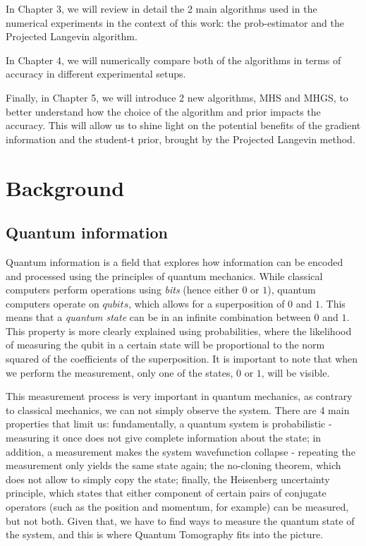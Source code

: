 \documentclass[12pt]{memoir}
\begin{document}
In Chapter 3, we will review in detail the 2 main algorithms used in the numerical experiments in the context of this work: the prob-estimator and the Projected Langevin algorithm.\medbreak

In Chapter 4, we will numerically compare both of the algorithms in terms of accuracy in different experimental setups.\medbreak

Finally, in Chapter 5, we will introduce 2 new algorithms, MHS and MHGS, to better understand how the choice of the algorithm and prior impacts the accuracy. This will allow us to shine light on the potential benefits of the gradient information and the student-t prior, brought by the Projected Langevin method.


\chapter{Background}

\section{Quantum information}

Quantum information is a field that explores how information can be encoded and processed using the principles of quantum mechanics. While classical computers perform operations using \textit{bits} (hence either $0$ or $1$), quantum computers operate on $qubits$, which allows for a superposition of $0$ and $1$. This means that a \textit{quantum state} can be in an infinite combination between $0$ and $1$. This property is more clearly explained using probabilities, where the likelihood of measuring the qubit in a certain state will be proportional to the norm squared of the coefficients of the superposition. It is important to note that when we perform the measurement, only one of the states, $0$ or $1$, will be visible.\medbreak

This measurement process is very important in quantum mechanics, as contrary to classical mechanics, we can not simply observe the system. There are 4 main properties that limit us: fundamentally, a quantum system is probabilistic - measuring it once does not give complete information about the state; in addition, a measurement makes the system wavefunction collapse - repeating the measurement only yields the same state again; the no-cloning theorem, which does not allow to simply copy the state; finally, the Heisenberg uncertainty principle, which states that either component of certain pairs of conjugate operators (such as the position and momentum, for example) can be measured, but not both. Given that, we have to find ways to measure the quantum state of the system, and this is where Quantum Tomography fits into the picture.\medbreak
\end{document}
